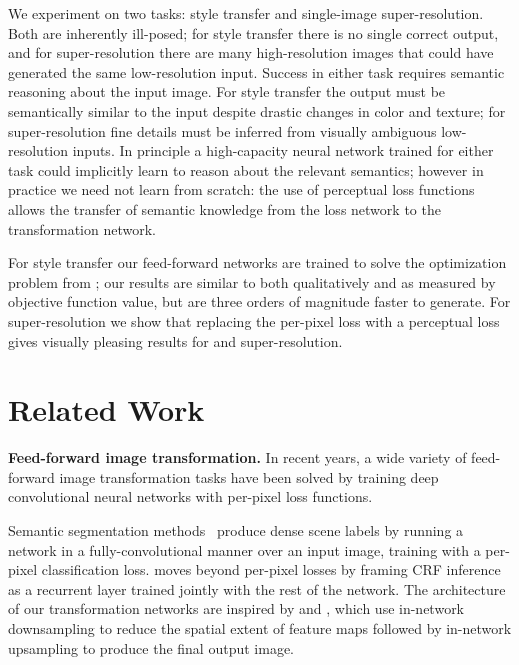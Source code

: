 \documentclass[runningheads]{llncs}
\begin{document}
We experiment on two tasks: style transfer and single-image super-resolution. Both are inherently
ill-posed; for style transfer there is no single correct output, and for super-resolution
there are many high-resolution images that could have generated the same low-resolution input.
Success in either task requires semantic reasoning about the input image. For style
transfer the output must be semantically similar to the input despite drastic changes in color
and texture; for super-resolution fine details must be inferred from visually ambiguous low-resolution
inputs. In principle a high-capacity neural network trained for either task could implicitly learn
to reason about the relevant semantics; however in practice we need not learn from scratch: the
use of perceptual loss functions allows the transfer of semantic knowledge from the loss network to
the transformation network.

For style transfer our feed-forward networks are trained to solve the optimization problem from
\cite{gatys2015neural}; our results are similar to \cite{gatys2015neural} both qualitatively and as
measured by objective function value, but are three orders
of magnitude faster to generate. For super-resolution we show that replacing the
per-pixel loss with a perceptual loss gives visually pleasing results for  and 
super-resolution.



















\section{Related Work}
\textbf{Feed-forward image transformation.}
In recent years, a wide variety of feed-forward image transformation tasks have been solved
by training deep convolutional neural networks with per-pixel loss functions.

Semantic segmentation methods~\cite{long_shelhamer_fcn,eigen2015predicting,farabet2013learning,pinheiro2013recurrent,noh2015learning,zheng2015conditional}
produce dense scene labels by running a network in a fully-convolutional manner over an input
image, training with a per-pixel classification loss. \cite{zheng2015conditional}
moves beyond per-pixel losses by framing CRF inference as a recurrent layer trained jointly with
the rest of the network. The architecture of our transformation networks are inspired by
\cite{long_shelhamer_fcn} and \cite{noh2015learning}, which use in-network downsampling to reduce
the spatial extent of feature maps followed by in-network upsampling to produce the final
output image.
\end{document}
